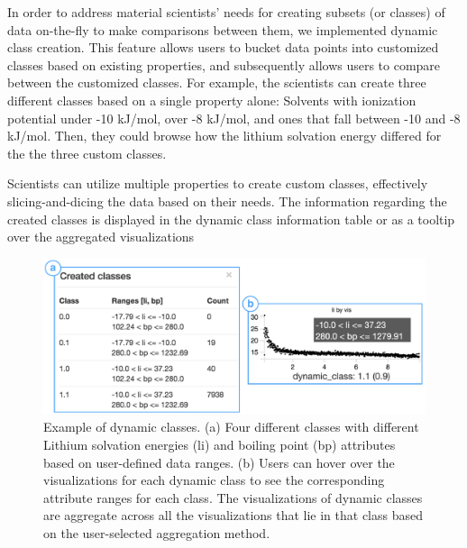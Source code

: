  In order to address material scientists' needs for creating subsets (or classes) of data on-the-fly to make comparisons between them, we implemented dynamic class creation. This feature allows users to bucket data points into customized classes based on existing properties, and subsequently allows users to compare between the customized classes. For example, the scientists can create three different classes based on a single property alone: Solvents with ionization potential under -10 kJ/mol, over -8 kJ/mol, and ones that fall between -10 and -8 kJ/mol. Then, they could browse how the lithium solvation energy differed for the the three custom classes. 
\par Scientists can utilize multiple properties to create custom classes, effectively slicing-and-dicing the data based on their needs. The information regarding the created classes is displayed in the dynamic class information table or as a tooltip over the aggregated visualizations
\begin{figure}[h!]
\centering
\includegraphics[width=\linewidth]{figures/dcc_example.pdf}
\vspace{-6pt}
\caption{Example of dynamic classes. (a) Four different classes with different Lithium solvation energies (li) and boiling point (bp) attributes based on user-defined data ranges. (b) Users can hover over the visualizations for each dynamic class to see the corresponding attribute ranges for each class. The visualizations of dynamic classes are aggregate across all the visualizations that lie in that class based on the user-selected aggregation method.}
\label{dcc}
\end{figure}
